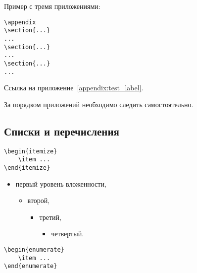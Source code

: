 \documentclass[14pt, a4paper, titlepage]{extarticle}
\renewcommand{\thesection}{\Asbuk{section}}
\let\oldsec\section
\renewcommand{\section}{
        \clearpage
        \phantomsection
        \refstepcounter{section}
        \addcontentsline{toc}{section}{\appendixname~\thesection}
        \oldsec*} %
\begin{document}
Пример с тремя приложениями:

\begin{verbatim}
\appendix
\section{...}
...
\section{...}
...
\section{...}
...
\end{verbatim}

Ссылка на приложение~\ref{appendix:test_label}.

За порядком приложений необходимо следить самостоятельно.

\subsection{Списки и перечисления}

\begin{verbatim}
\begin{itemize}
    \item ...
\end{itemize}
\end{verbatim}

\begin{itemize}
    \item первый уровень вложенности,
    \begin{itemize}
        \item второй,
        \begin{itemize}
            \item третий,
            \begin{itemize}
                \item четвертый.
            \end{itemize}
        \end{itemize}
    \end{itemize}
\end{itemize}

\begin{verbatim}
\begin{enumerate}
    \item ...
\end{enumerate} 
\end{verbatim}
\end{document}
